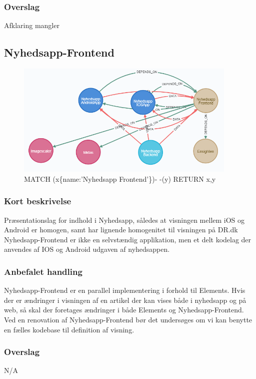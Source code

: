 \documentclass{article}
\begin{document}
\subsubsection{Overslag}
Afklaring mangler

\subsection{Nyhedsapp-Frontend}
\begin{figure}[h]
\includegraphics[width=300pt]{Nyhedsapp-Frontend.PNG}
\caption{MATCH (x\{name:'Nyhedsapp Frontend'\})- -(y) RETURN x,y}
\end{figure}
\subsubsection{Kort beskrivelse}
Præsentationslag for indhold i Nyhedsapp, således at visningen mellem iOS og Android er homogen, samt har lignende homogenitet til visningen på DR.dk
Nyhedsapp-Frontend er ikke en selvstændig applikation, men et delt kodelag der anvendes af IOS og Android udgaven af nyhedsappen. 
\subsubsection{Anbefalet handling}
Nyhedsapp-Frontend er en parallel implementering i forhold til Elements. Hvis der er ændringer i visningen af en artikel der kan vises både i nyhedsapp og på web, så skal der foretages ændringer i både Elements og Nyhedsapp-Frontend. Ved en renovation af Nyhedsapp-Frontend bør det undersøges om vi kan benytte en fælles kodebase til definition af visning.
\subsubsection{Overslag}
N/A
\end{document}
